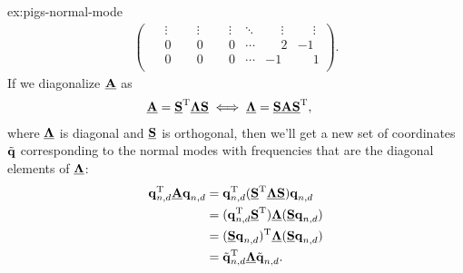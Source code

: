 \begin{DefAnswer}{ex:pigs-normal-mode}
\begin{align}
\begin{pmatrix}
				\phantom{-}\vdots & \phantom{-}\vdots & \phantom{-}\vdots & \ddots & \phantom{-}\vdots & \phantom{-}\vdots \\
				\phantom{-}0 & \phantom{-}0 & \phantom{-}0 & \cdots & \phantom{-}2 & -1 \\
				\phantom{-}0 & \phantom{-}0 & \phantom{-}0 & \cdots & -1 & \phantom{-}1 \\
			\end{pmatrix}.
				\label{eq:nm-matrix-full}
	\end{align}
	If we diagonalize $\underline{\bm{\mathbf{A}}}$ as
	\begin{align}
		\underline{\bm{\mathbf{A}}}
		= \underline{\bm{\mathbf{S}}}^\mathrm{T} \underline{\bm{\mathbf{\Lambda}}} \underline{\bm{\mathbf{S}}}
		&\iff
		\underline{\bm{\mathbf{\Lambda}}}
		= \underline{\bm{\mathbf{S}}} \underline{\bm{\mathbf{A}}} \underline{\bm{\mathbf{S}}}^\mathrm{T},
			\label{eq:nm-diagonalization}
	\end{align}
	where $\underline{\bm{\mathbf{\Lambda}}}$ is diagonal and $\underline{\bm{\mathbf{S}}}$ is orthogonal, then we'll get a new set of coordinates $\tilde{\bm{\mathbf{q}}}$ corresponding to the normal modes with frequencies that are the diagonal elements of $\underline{\bm{\mathbf{\Lambda}}}$:
	\begin{subequations}
	\begin{align}
		\bm{\mathbf{q}}_{n,d}^\mathrm{T} \underline{\bm{\mathbf{A}}} \bm{\mathbf{q}}_{n,d}
		&= \bm{\mathbf{q}}_{n,d}^\mathrm{T} (\underline{\bm{\mathbf{S}}}^\mathrm{T} \underline{\bm{\mathbf{\Lambda}}} \underline{\bm{\mathbf{S}}}) \bm{\mathbf{q}}_{n,d} \\
		&= (\bm{\mathbf{q}}_{n,d}^\mathrm{T} \underline{\bm{\mathbf{S}}}^\mathrm{T}) \underline{\bm{\mathbf{\Lambda}}} (\underline{\bm{\mathbf{S}}} \bm{\mathbf{q}}_{n,d}) \\
		&= (\underline{\bm{\mathbf{S}}} \bm{\mathbf{q}}_{n,d})^\mathrm{T} \underline{\bm{\mathbf{\Lambda}}} (\underline{\bm{\mathbf{S}}} \bm{\mathbf{q}}_{n,d}) \\
		&= \tilde{\bm{\mathbf{q}}}_{n,d}^\mathrm{T} \underline{\bm{\mathbf{\Lambda}}} \tilde{\bm{\mathbf{q}}}_{n,d}.
	\end{align}
	\end{subequations}


\end{DefAnswer}
